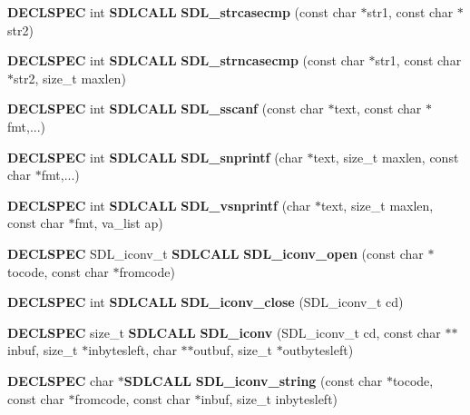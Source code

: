 \begin{DoxyCompactItemize}
\item 
{\bf D\+E\+C\+L\+S\+P\+E\+C} int {\bf S\+D\+L\+C\+A\+L\+L} {\bfseries S\+D\+L\+\_\+strcasecmp} (const char $\ast$str1, const char $\ast$str2)\label{_s_d_l__stdinc_8h_a1de324579fee4225e390df0a7b485d17}

\item 
{\bf D\+E\+C\+L\+S\+P\+E\+C} int {\bf S\+D\+L\+C\+A\+L\+L} {\bfseries S\+D\+L\+\_\+strncasecmp} (const char $\ast$str1, const char $\ast$str2, size\+\_\+t maxlen)\label{_s_d_l__stdinc_8h_ae2b36260891291943d2c8f7a6b991847}

\item 
{\bf D\+E\+C\+L\+S\+P\+E\+C} int {\bf S\+D\+L\+C\+A\+L\+L} {\bfseries S\+D\+L\+\_\+sscanf} (const char $\ast$text, const char $\ast$fmt,...)\label{_s_d_l__stdinc_8h_a036a33efecd221ef8760010e5bca9d86}

\item 
{\bf D\+E\+C\+L\+S\+P\+E\+C} int {\bf S\+D\+L\+C\+A\+L\+L} {\bfseries S\+D\+L\+\_\+snprintf} (char $\ast$text, size\+\_\+t maxlen, const char $\ast$fmt,...)\label{_s_d_l__stdinc_8h_a4282a001a36dfd2286c41a3685281e5c}

\item 
{\bf D\+E\+C\+L\+S\+P\+E\+C} int {\bf S\+D\+L\+C\+A\+L\+L} {\bfseries S\+D\+L\+\_\+vsnprintf} (char $\ast$text, size\+\_\+t maxlen, const char $\ast$fmt, va\+\_\+list ap)\label{_s_d_l__stdinc_8h_abdef8ba556177f8a9395139997e6cb40}

\item 
{\bf D\+E\+C\+L\+S\+P\+E\+C} S\+D\+L\+\_\+iconv\+\_\+t {\bf S\+D\+L\+C\+A\+L\+L} {\bfseries S\+D\+L\+\_\+iconv\+\_\+open} (const char $\ast$tocode, const char $\ast$fromcode)\label{_s_d_l__stdinc_8h_a0ba254663bb7d4b49eaa414d4533c6b5}

\item 
{\bf D\+E\+C\+L\+S\+P\+E\+C} int {\bf S\+D\+L\+C\+A\+L\+L} {\bfseries S\+D\+L\+\_\+iconv\+\_\+close} (S\+D\+L\+\_\+iconv\+\_\+t cd)\label{_s_d_l__stdinc_8h_a92eeaa95348c308ebd882ca85eccd684}

\item 
{\bf D\+E\+C\+L\+S\+P\+E\+C} size\+\_\+t {\bf S\+D\+L\+C\+A\+L\+L} {\bfseries S\+D\+L\+\_\+iconv} (S\+D\+L\+\_\+iconv\+\_\+t cd, const char $\ast$$\ast$inbuf, size\+\_\+t $\ast$inbytesleft, char $\ast$$\ast$outbuf, size\+\_\+t $\ast$outbytesleft)\label{_s_d_l__stdinc_8h_aeef39b9728425f231fc3e019ffa6c9ea}

\item 
{\bf D\+E\+C\+L\+S\+P\+E\+C} char $\ast${\bf S\+D\+L\+C\+A\+L\+L} {\bf S\+D\+L\+\_\+iconv\+\_\+string} (const char $\ast$tocode, const char $\ast$fromcode, const char $\ast$inbuf, size\+\_\+t inbytesleft)
\end{DoxyCompactItemize}
